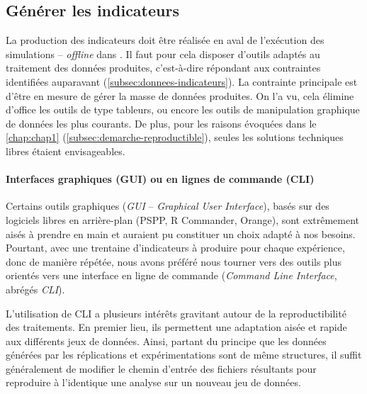 \subsection{Générer les indicateurs}

La production des indicateurs doit être réalisée en aval de l'exécution des simulations -- \og \textit{offline}\fg{} dans \textcite{grignard_agent-based_2017}.
Il faut pour cela disposer d'outils adaptés au traitement des données produites, c'est-à-dire répondant aux contraintes identifiées auparavant (\autoref{subsec:donnees-indicateurs}).
La contrainte principale est d'être en mesure de gérer la masse de données produites.
On l'a vu, cela élimine d'office les outils de type tableurs, ou encore les outils de manipulation graphique de données les plus courants.
De plus, pour les raisons évoquées dans le \cref{chap:chap1} (\cref{subsec:demarche-reproductible}), seules les solutions techniques libres étaient envisageables.

\paragraph{Interfaces graphiques (GUI) ou en lignes de commande (CLI)}
Certains outils graphiques (\textit{GUI} -- \textit{Graphical User Interface}), basés sur des logiciels libres en arrière-plan (PSPP, R Commander, Orange), sont extrêmement aisés à prendre en main et auraient pu constituer un choix adapté à nos besoins.
Pourtant, avec une trentaine d'indicateurs à produire pour chaque expérience, donc de manière répétée, nous avons préféré nous tourner vers des outils plus orientés vers une interface en ligne de commande (\textit{Command Line Interface}, abrégés \textit{CLI}).

L'utilisation de CLI a plusieurs intérêts gravitant autour de la reproductibilité des traitements.
En premier lieu, ils permettent une adaptation aisée et rapide aux différents jeux de données.
Ainsi, partant du principe que les données générées par les réplications et expérimentations sont de même structures, il suffit généralement de modifier le chemin d'entrée des fichiers résultants pour reproduire à l'identique une analyse sur un nouveau jeu de données.

